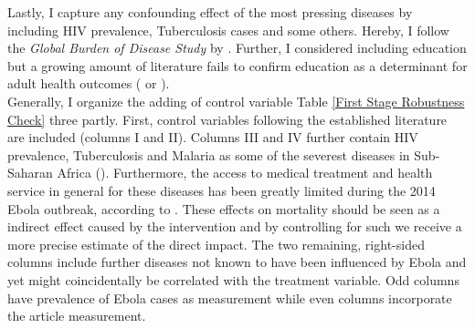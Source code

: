\documentclass{article}
\begin{document}
Lastly, I capture any confounding effect of the most pressing diseases by including HIV prevalence, Tuberculosis cases and some others. Hereby, I follow the \textit{Global Burden of Disease Study} by \cite{lozano2012global}. Further, I considered including education but a growing amount of literature fails to confirm education as a determinant for adult health outcomes (\cite{clark2013effect} or \cite{meghir2018education}).\\
Generally, I organize the adding of control variable Table \ref{First Stage Robustness Check} three partly. First, control variables following the established literature are included (columns I and II). Columns III and IV further contain HIV prevalence, Tuberculosis and Malaria as some of the severest diseases in Sub-Saharan Africa (\cite{lozano2012global}). Furthermore, the access to medical treatment and health service in general for these diseases has been greatly limited during the 2014 Ebola outbreak, according to \cite{parpia2016effects}. These effects on mortality should be seen as a indirect effect caused by the intervention and by controlling for such we receive a more precise estimate of the direct impact. The two remaining, right-sided columns include further diseases not known to have been influenced by Ebola and yet might coincidentally be correlated with the treatment variable. Odd columns have prevalence of Ebola cases as measurement while even columns incorporate the article measurement.\\
\end{document}

